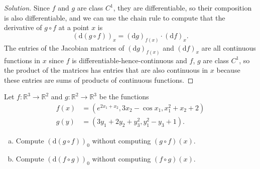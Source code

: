 \documentclass[11pt]{scrartcl}
\providecommand{\RR}{\mathbb R}
\providecommand{\ii}{\item}
\newenvironment{soln}{\begin{proof}[Solution]}{\end{proof}}
\begin{document}
\begin{soln}
	Since $f$ and $g$ are class $C^1$, they are differentiable,
	so their composition is also differentiable,
	and we can use the chain rule to compute that
	the derivative of $g\circ f$ at a point $x$ is
	\[(\mathrm d(g\circ f))_x = (\mathrm dg)_{f(x)}\cdot(\mathrm df)_x.\]
	The entries of the Jacobian matrices of
	$(\mathrm dg)_{f(x)}$ and $(\mathrm df)_x$
	are all continuous functions in $x$
	since $f$ is differentiable-hence-continuous
	and $f$, $g$ are class $C^1$, so the product of the matrices
	has entries that are also continuous in $x$
	because these entries are sums of products of continuous functions.
\end{soln}

\begin{problem}
	Let $f\colon\RR^3\to\RR^2$ and $g\colon\RR^2\to\RR^3$ be the functions
	\begin{align*}
		f(x) &= (e^{2x_1 + x_2}, 3x_2 - \cos x_1, x_1^2 + x_2 + 2)\\
		g(y) &= (3y_1 + 2y_2 + y_3^2, y_1^2 - y_3 + 1).
	\end{align*}
	\begin{enumerate}[(a)]
		\ii Compute $(\mathrm d(g\circ f))_0$ without computing $(g\circ f)(x)$.
		\ii Compute $(\mathrm d(f\circ g))_0$ without computing $(f\circ g)(x)$.
	\end{enumerate}
\end{problem}
\end{document}
